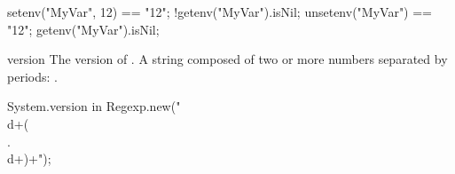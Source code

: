 \begin{urbiscriptapi}
\begin{urbiassert}
setenv("MyVar", 12) == "12";
!getenv("MyVar").isNil;
unsetenv("MyVar") == "12";
getenv("MyVar").isNil;
\end{urbiassert}


\item[version]%
  The version of \usdk.  A string composed of two or more numbers separated
  by periods: .
\begin{urbiassert}
System.version in Regexp.new("\\d+(\\.\\d+)+");
\end{urbiassert}
\end{urbiscriptapi}

